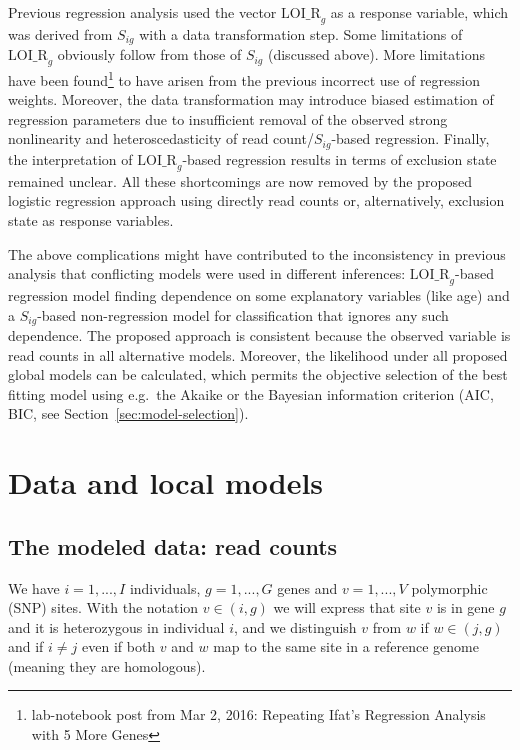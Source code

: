 \documentclass[letterpaper]{article}
\begin{document}
Previous regression analysis used the vector \(\mathrm{LOI\_R}_g\) as a
response variable, which was derived from \(S_{ig}\) with a data
transformation step.  Some limitations of \(\mathrm{LOI\_R}_g\) obviously
follow from those of \(S_{ig}\) (discussed above).  More limitations have been
found\footnote{lab-notebook post from Mar 2, 2016: Repeating Ifat's Regression
Analysis with 5 More Genes} to have arisen from the previous incorrect use of
regression weights.  Moreover, the data transformation may introduce biased
estimation of regression parameters due to insufficient removal of the
observed strong nonlinearity and heteroscedasticity of read
count/\(S_{ig}\)-based regression.  Finally, the interpretation of
\(\mathrm{LOI\_R}_g\)-based regression results in terms of exclusion state
remained unclear.  All these shortcomings are now removed by the proposed
logistic regression approach using directly read counts or, alternatively,
exclusion state as response variables.

The above complications might have contributed to the inconsistency in
previous analysis that conflicting models were used in different inferences:
\(\mathrm{LOI\_R}_g\)-based regression model finding dependence on some
explanatory variables (like age) and a \(S_{ig}\)-based non-regression model
for classification that ignores any such dependence.  The proposed approach is
consistent because the observed variable is read counts in all alternative
models.  Moreover, the likelihood under all proposed global models can be
calculated, which permits the objective selection of the best fitting model
using e.g.~the Akaike or the Bayesian information criterion (AIC, BIC, see
Section~\ref{sec:model-selection}).

\section{Data and local models}

\subsection{The modeled data: read counts}

We have \(i=1,...,I\) individuals, \(g=1,...,G\) genes and \(v=1,...,V\)
polymorphic (SNP) sites.  With the notation \(v\in(i,g)\) we will express that site \(v\) is in
gene \(g\) and it is heterozygous in individual \(i\), and we distinguish \(v\)
from \(w\) if \(w\in(j,g)\) and if \(i\neq j\) even if both \(v\) and \(w\) map to
the same site in a reference genome (meaning they are homologous).
\end{document}
